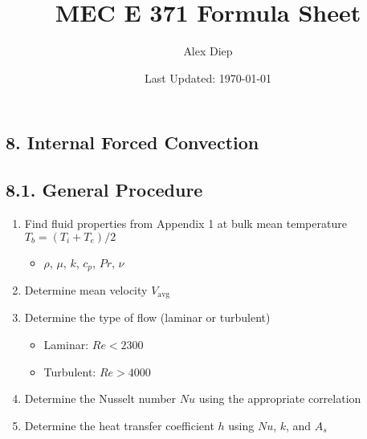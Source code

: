 \documentclass[10pt]{article}
\title{MEC E 371 Formula Sheet}
\author{Alex Diep}
\date{Last Updated: \today}
\begin{document}
\maketitle
\thispagestyle{empty}
\begin{multicols*}{2}
\section*{8. Internal Forced Convection}
\subsection*{8.1. General Procedure}
\begin{enumerate}
    \item Find fluid properties from Appendix 1 at bulk mean temperature $T_b = (T_i + T_e)/2$
    \begin{itemize}
        \item $\rho$, $\mu$, $k$, $c_p$, $Pr$, $\nu$
    \end{itemize}
    \item Determine mean velocity $V_{\text{avg}}$
    \item Determine the type of flow (laminar or turbulent)
    \begin{itemize}
        \item Laminar: $Re < 2300$
        \item Turbulent: $Re > 4000$
    \end{itemize}
    \item Determine the Nusselt number $Nu$ using the appropriate correlation
    \item Determine the heat transfer coefficient $h$ using $Nu$, $k$, and $A_s$
\end{enumerate}


\end{multicols*}
\end{document}
